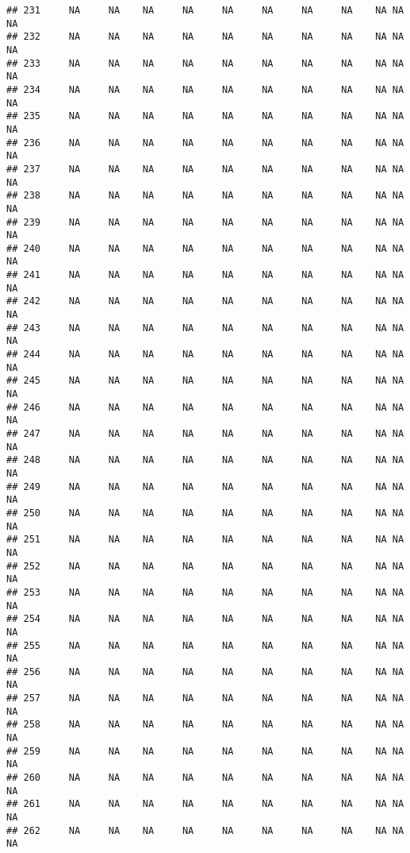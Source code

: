 \documentclass[]{article}
\begin{document}
\begin{verbatim}
## 231     NA     NA    NA     NA     NA     NA     NA     NA    NA NA          NA
## 232     NA     NA    NA     NA     NA     NA     NA     NA    NA NA          NA
## 233     NA     NA    NA     NA     NA     NA     NA     NA    NA NA          NA
## 234     NA     NA    NA     NA     NA     NA     NA     NA    NA NA          NA
## 235     NA     NA    NA     NA     NA     NA     NA     NA    NA NA          NA
## 236     NA     NA    NA     NA     NA     NA     NA     NA    NA NA          NA
## 237     NA     NA    NA     NA     NA     NA     NA     NA    NA NA          NA
## 238     NA     NA    NA     NA     NA     NA     NA     NA    NA NA          NA
## 239     NA     NA    NA     NA     NA     NA     NA     NA    NA NA          NA
## 240     NA     NA    NA     NA     NA     NA     NA     NA    NA NA          NA
## 241     NA     NA    NA     NA     NA     NA     NA     NA    NA NA          NA
## 242     NA     NA    NA     NA     NA     NA     NA     NA    NA NA          NA
## 243     NA     NA    NA     NA     NA     NA     NA     NA    NA NA          NA
## 244     NA     NA    NA     NA     NA     NA     NA     NA    NA NA          NA
## 245     NA     NA    NA     NA     NA     NA     NA     NA    NA NA          NA
## 246     NA     NA    NA     NA     NA     NA     NA     NA    NA NA          NA
## 247     NA     NA    NA     NA     NA     NA     NA     NA    NA NA          NA
## 248     NA     NA    NA     NA     NA     NA     NA     NA    NA NA          NA
## 249     NA     NA    NA     NA     NA     NA     NA     NA    NA NA          NA
## 250     NA     NA    NA     NA     NA     NA     NA     NA    NA NA          NA
## 251     NA     NA    NA     NA     NA     NA     NA     NA    NA NA          NA
## 252     NA     NA    NA     NA     NA     NA     NA     NA    NA NA          NA
## 253     NA     NA    NA     NA     NA     NA     NA     NA    NA NA          NA
## 254     NA     NA    NA     NA     NA     NA     NA     NA    NA NA          NA
## 255     NA     NA    NA     NA     NA     NA     NA     NA    NA NA          NA
## 256     NA     NA    NA     NA     NA     NA     NA     NA    NA NA          NA
## 257     NA     NA    NA     NA     NA     NA     NA     NA    NA NA          NA
## 258     NA     NA    NA     NA     NA     NA     NA     NA    NA NA          NA
## 259     NA     NA    NA     NA     NA     NA     NA     NA    NA NA          NA
## 260     NA     NA    NA     NA     NA     NA     NA     NA    NA NA          NA
## 261     NA     NA    NA     NA     NA     NA     NA     NA    NA NA          NA
## 262     NA     NA    NA     NA     NA     NA     NA     NA    NA NA          NA

\end{verbatim}
\end{document}
